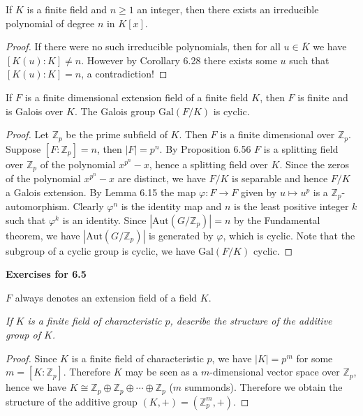 \begin{corollary}
If $K$ is a finite field and $n\ge 1$ an integer, then there exists an irreducible polynomial of degree $n$ in $K[x]$.
\end{corollary}
\begin{proof}
If there were no such irreducible polynomials, then for all $u\in\overline{K}$ we have $[K(u):K]\ne n$. However by Corollary 6.28 there exists some $u$ such that $[K(u):K]=n$, a contradiction!
\end{proof}
\begin{proposition}
If $F$ is a finite dimensional extension field of a finite field $K$, then $F$ is finite and is Galois over $K$. The Galois group $\mathrm{Gal}(F/K)$ is cyclic.
\end{proposition}
\begin{proof}
Let $\mathbb{Z}_p$ be the prime subfield of $K$. Then $F$ is a finite dimensional over $\mathbb{Z}_p$. Suppose $[F:\mathbb{Z}_p]=n$, then $|F|=p^n$. By Proposition 6.56 $F$ is a splitting field over $\mathbb{Z}_p$ of the polynomial $x^{p^n}-x$, hence a splitting field over $K$. Since the zeros of the polynomial $x^{p^n}-x$ are distinct, we have $F/K$ is separable and hence $F/K$ a Galois extension. By Lemma 6.15 the map $\varphi:F\to F$ given by $u\mapsto u^p$ is a $\mathbb{Z}_p$-automorphism. Clearly $\varphi^n$ is the identity map and $n$ is the least positive integer $k$ such that $\varphi^k$ is an identity. Since $|\mathrm{Aut}(G/\mathbb{Z}_p)|=n$ by the Fundamental theorem, we have $|\mathrm{Aut}(G/\mathbb{Z}_p)|$ is generated by $\varphi$, which is cyclic. Note that the subgroup of a cyclic group is cyclic, we have $\mathrm{Gal}(F/K)$ cyclic.
\end{proof}
\begin{center}
\begin{large}
    \textbf{Exercises for 6.5}
\end{large}
\end{center}
$F$ always denotes an extension field of a field $K$.
\begin{problem}\em
If $K$ is a finite field of characteristic $p$, describe the structure of the additive group of $K$.
\end{problem}
\begin{proof}
Since $K$ is a finite field of characteristic $p$, we have $|K|=p^m$ for some $m=[K:\mathbb{Z}_p]$. Therefore $K$ may be seen as a $m$-dimensional vector space over $\mathbb{Z}_p$, hence we have $K\cong\mathbb{Z}_p\oplus\mathbb{Z}_p\oplus\cdots\oplus\mathbb{Z}_p$ ($m$ summonds). Therefore we obtain the structure of the additive group $(K,+)=(\mathbb{Z}_p^m,+)$.
\end{proof}
